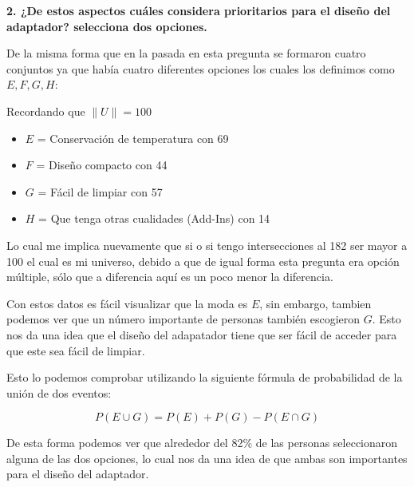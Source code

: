 \textbf{2. ¿De estos aspectos cuáles considera prioritarios para el diseño del adaptador? selecciona dos opciones.}

\tab De la misma forma que en la pasada en esta pregunta se formaron cuatro conjuntos ya que había cuatro diferentes opciones los cuales los definimos como $E,F,G,H$:

Recordando que $\|U\| = 100$
\begin{itemize}
     \item $E$ = Conservación de temperatura con 69
     \item $F$ = Diseño compacto con 44
     \item $G$ = Fácil de limpiar con 57
     \item $H$ = Que tenga otras cualidades (Add-Ins) con 14
\end{itemize}

\tab Lo cual me implica nuevamente que si o si tengo intersecciones al 182 ser mayor a 100 el cual es mi universo, debido a que de igual forma esta pregunta era opción múltiple, sólo que a diferencia aquí es un poco menor la diferencia.

\tab Con estos datos es fácil visualizar que la moda es $E$, sin embargo, tambien podemos ver que un número importante de personas también escogieron $G$. Esto nos da una idea que el diseño del adapatador tiene que ser fácil de acceder para que este sea fácil de limpiar. 

\tab Esto lo podemos comprobar utilizando la siguiente fórmula de probabilidad de la unión de dos eventos:

\begin{equation*}
    P(E\cup G) = P(E) + P(G) - P(E\cap G)
\end{equation*}

\tab De esta forma podemos ver que alrededor del 82\% de las personas seleccionaron alguna de las dos opciones, lo cual nos da una idea de que ambas son importantes para el diseño del adaptador.